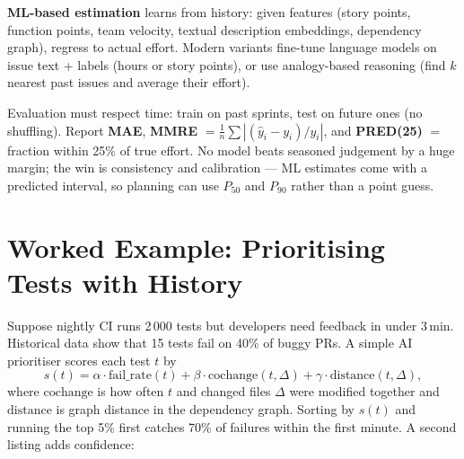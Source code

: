 \textbf{ML-based estimation} learns from history: given features (story points, function points, team velocity, textual description embeddings, dependency graph), regress to actual effort. Modern variants fine-tune language models on issue text + labels (hours or story points), or use analogy-based reasoning (find $k$ nearest past issues and average their effort).

Evaluation must respect time: train on past sprints, test on future ones (no shuffling). Report \textbf{MAE}, \textbf{MMRE} $=\frac1n\sum|(\hat y_i-y_i)/y_i|$, and \textbf{PRED(25)} $=$ fraction within 25\% of true effort. No model beats seasoned judgement by a huge margin; the win is consistency and calibration --- ML estimates come with a predicted interval, so planning can use $P_{50}$ and $P_{90}$ rather than a point guess.

\begin{center}
\end{center}

\section{Worked Example: Prioritising Tests with History}\label{sec:devops-worked}
Suppose nightly CI runs 2\,000 tests but developers need feedback in under 3\,min. Historical data show that 15 tests fail on 40\% of buggy PRs. A simple AI prioritiser scores each test $t$ by
\[
  s(t) = \alpha\cdot \text{fail\_rate}(t) + \beta\cdot \text{cochange}(t,\Delta) + \gamma\cdot \text{distance}(t,\Delta),
\]
where $\text{cochange}$ is how often $t$ and changed files $\Delta$ were modified together and $\text{distance}$ is graph distance in the dependency graph. Sorting by $s(t)$ and running the top 5\% first catches 70\% of failures within the first minute. A second listing adds confidence:

